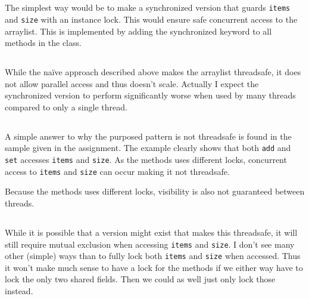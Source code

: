 \documentclass{ituhandin}
\begin{document}
\chapter{} %
\section{}
The simplest way would be to make a synchronized version that guards \texttt{items} and \texttt{size} with an instance lock. This would ensure safe concurrent access to the arraylist. This is implemented by adding the synchronized keyword to all methods in the class.

\section{}\label{sec:lock}
While the naïve approach described above makes the arraylist threadsafe, it does not allow parallel access and thus doesn't scale. Actually I expect the synchronized version to perform significantly worse when used by many threads compared to only a single thread.
\section{}
A simple answer to why the purposed pattern is not threadsafe is found in the sample given in the assignment. The example clearly shows that both \texttt{add} and \texttt{set} accesses \texttt{items} and \texttt{size}. As the methods uses different locks, concurrent access to \texttt{items} and \texttt{size} can occur making it not threadsafe.

Because the methods uses different locks, visibility is also not guaranteed between threads.

\section{}
While it is possible that a version might exist that makes this threadsafe, it will still require mutual exclusion when accessing \texttt{items} and \texttt{size}. I don't see many other (simple) ways than to fully lock both \texttt{items} and \texttt{size} when accessed. Thus it won't make much sense to have a lock for the methods if we either way have to lock the only two shared fields. Then we could as well just only lock those instead.
\end{document}
